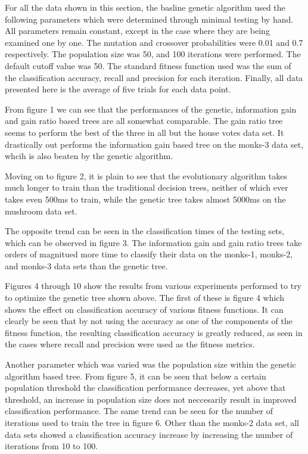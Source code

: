 \documentclass[12pt, letterpaper]{article}
\begin{document}
For all the data shown in this section, the basline genetic algorithm used the 
following parameters which were determined through minimal testing by hand.  
All parameters remain constant, except in the case where they are being
examined one by one.  The mutation and crossover probabilities were 0.01 and 
0.7 respectively.  The population size was 50, and 100 iterations were 
performed.  The default cutoff value was 50.
The standard fitness function used was the sum of the classification accuracy,
recall and precision for each iteration.  Finally, all data presented here is 
the average of five trials for each data point.  

From figure 1 we can see that the performances of the genetic, information
gain and gain ratio based trees are all somewhat comparable.  The gain ratio
tree seems to perform the best of the three in all but the house votes data set.
It drastically out performs the information gain based tree on the monks-3 data
set, whcih is also beaten by the genetic algorithm.

Moving on to figure 2, it is plain to see that the evolutionary algorithm
takes much longer to train than the traditional decision trees, neither of which
ever takes even 500ms to train, while the genetic tree takes almost 5000ms on 
the mushroom data set.

The opposite trend can be seen in the classification times of the testing sets,
which can be observed in figure 3.
The information gain and gain ratio trees take orders of magnitued more time
to classify their data on the monks-1, monks-2, and monks-3 data sets than the
genetic tree.

Figures 4 through 10 show the results from various experiments performed to 
try to optimize the genetic tree shown above. The first of these is figure 4
which shows the effect on classification accuracy of various fitness functions.
It can clearly be seen that by not using the accuracy as one of the components
of the fitness function, the resulting classification accuracy is greatly
reduced, as seen in the cases where recall and precision were used as the 
fitness metrics.

Another parameter which was varied was the population size within the genetic
algorithm based tree.  From figure 5, it can be seen that below a certain 
population threshold the classification performance decreases, yet above that
threshold, an increase in population size does not neccesarily result in 
improved classification performance. The same trend can be seen for the number
of iterations used to train the tree in figure 6. Other than the monks-2 data 
set, all data sets showed a classification accuracy increase by increasing the
number of iterations from 10 to 100.
\end{document}
